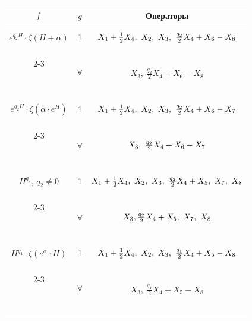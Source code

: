 \begin{center} 


\begin{tabular}{|c|c|c|} 


\hline 


$\myrule f$ & $g$ & Операторы \\ 


\hline 


%


$e^{q_2H}\cdot\zeta(H+\alpha)$ & 1 &


$\myrule X_1+\frac12 X_4,\ X_2,\ X_3,\


\frac{q_2}{2}X_4+X_6-X_8$ \\


\cline{2-3}


\ & $\myrule \forall$ & $X_3,\ \frac{q_2}{2}X_4+X_6-X_8$\\


\hline


%


$e^{q_2H}\cdot\zeta(\alpha\cdot e^H)$ & 1 &


$\myrule X_1+\frac12 X_4,\ X_2,\ X_3,\


\frac{q_2}{2}X_4+X_6-X_7$ \\


\cline{2-3}


\ & $\forall$ & $\myrule X_3,\ \frac{q_2}{2}X_4+X_6-X_7$\\


\hline


%


$H^{q_2}$, $q_2\ne0$ & 1 &


$\myrule X_1+\frac12 X_4,\ X_2,\ X_3,\ \frac{q_2}{2}X_4+


X_5,\ X_7,\ X_8$ \\


\cline{2-3}


\ & $\forall$ & $\myrule X_3,\frac{q_2}{2}X_4+X_5,\ X_7,\ X_8$\\


\hline


%


$H^{q_1}\cdot\zeta(e^\alpha\cdot H)$ & 1 &


$\myrule X_1+\frac12 X_4,\ X_2,\ X_3,


\ \frac{q_1}{2}X_4+X_5-X_8$ \\


\cline{2-3}


\ & $\myrule \forall$ & $X_3,\ \frac{q_1}{2}X_4+X_5-X_8$ \\



\end{tabular}
\end{center}
